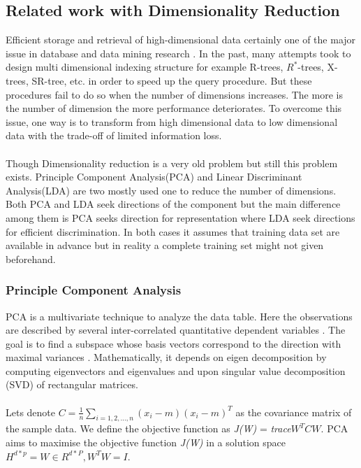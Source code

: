 \subsection{Related work with Dimensionality Reduction}
Efficient storage and retrieval of high-dimensional data certainly one of the major issue in database and data mining  research \cite{thesis2}. In the past, many attempts took to design multi dimensional indexing structure for example R-trees, $R^{*}$-trees, X-trees, SR-tree, etc. in order to speed up the query procedure. But these procedures fail to do so when the number of dimensions increases. The more is the number of dimension the more performance deteriorates. To overcome this issue, one way is to transform from high dimensional data to low dimensional data with the trade-off of limited information loss.\\\\
Though Dimensionality reduction is a very old problem but still this problem exists. Principle Component Analysis(PCA) and Linear Discriminant Analysis(LDA) are two mostly used one to reduce the number of dimensions. Both PCA and LDA seek directions of the component but the main difference among them is PCA seeks direction for representation where LDA seek directions for efficient discrimination. In both cases it assumes that training data set are available in advance but in reality a complete training set might not given beforehand.
\subsubsection{Principle Component Analysis}
PCA is a multivariate technique to analyze the data table. Here the observations are described by several inter-correlated quantitative dependent variables \cite{p314}. The goal is to find a subspace whose basis vectors correspond to the direction with maximal variances \cite{thesis1}. Mathematically, it depends on eigen decomposition by computing eigenvectors and eigenvalues and upon singular value decomposition (SVD) of rectangular matrices.\\\\
Lets denote $C = \frac{1}{n} \sum_{i=1,2,...,n}(x_i - m) (x_i - m)^T$ as the covariance matrix of the sample data. We define the objective function as \textit{J(W)} = \textit{trace$W^TCW$}. PCA aims to maximise the objective function \textit{J(W)} in a solution space \textit{$H^{d*p} = {W \in R^{d*P}, W^TW = I}$}.
